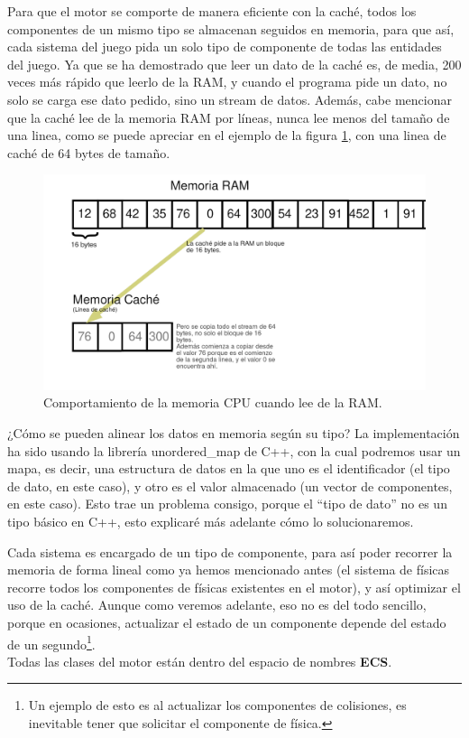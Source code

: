 Para que el motor se comporte de manera eficiente con la caché, todos los componentes de un mismo tipo se almacenan seguidos en memoria, para que así, cada sistema del juego pida un solo tipo de componente de todas las entidades del juego. Ya que se ha demostrado que leer un dato de la caché es, de media, 200 veces más rápido que leerlo de la RAM, y cuando el programa pide un dato, no solo se carga ese dato pedido, sino un stream de datos. Además, cabe mencionar que la caché lee de la memoria RAM por líneas, nunca lee menos del tamaño de una linea, como se puede apreciar en el ejemplo de la figura \ref{Memoria RAM y CPU}, con una linea de caché de 64 bytes de tamaño.
\begin{figure}[H]
	\centering
	\includegraphics[width=15cm]{archivos/imagenes/comportamiento-memoria-cpu-ram.png}
	\caption{Comportamiento de la memoria CPU cuando lee de la RAM.}
	\label{Memoria RAM y CPU}
\end{figure}

¿Cómo se pueden alinear los datos en memoria según su tipo? La implementación ha sido usando la librería unordered\_map de C++, con la cual podremos usar un mapa, es decir, una estructura de datos en la que uno es el identificador (el tipo de dato, en este caso), y otro es el valor almacenado (un vector de componentes, en este caso).  Esto trae un problema consigo, porque el ``tipo de dato'' no es un tipo básico en C++, esto explicaré más adelante cómo lo solucionaremos. 

Cada sistema es encargado de un tipo de componente, para así poder recorrer la memoria de forma lineal como ya hemos mencionado antes (el sistema de físicas recorre todos los componentes de físicas existentes en el motor), y así optimizar el uso de la caché. Aunque como veremos adelante, eso no es del todo sencillo, porque en ocasiones, actualizar el estado de un componente depende del estado de un segundo\footnote{Un ejemplo de esto es al actualizar los componentes de colisiones, es inevitable tener que solicitar el componente de física.}.
\\
Todas las clases del motor están dentro del espacio de nombres \textbf{ECS}.

